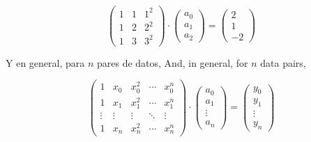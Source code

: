 \begin{equation*}
\begin{pmatrix}
1&1&1^2\\
1&2&2^2\\
1&3&3^2
\end{pmatrix}\cdot \begin{pmatrix}
a_0\\
a_1\\
a_2
\end{pmatrix}=\begin{pmatrix}
2\\
1\\
-2
\end{pmatrix}
\end{equation*}
\begin{paracol}{2}
Y en general, para $n$ pares de datos,
\switchcolumn
And, in general, for $n$ data pairs,
\end{paracol}
\begin{equation*}
\begin{pmatrix}
1&x_0&x_0^2&\cdots &x_0^n\\
1&x_1&x_1^2&\cdots &x_1^n\\
\vdots&\vdots&\vdots&\ddots&\vdots\\
1&x_n&x_n^2&\cdots &x_n^n
\end{pmatrix}\cdot \begin{pmatrix}
a_0\\
a_1\\
\vdots\\
a_n

\end{pmatrix}=\begin{pmatrix}
y_0\\
y_1\\
\vdots\\
y_n
\end{pmatrix}
\end{equation*}
